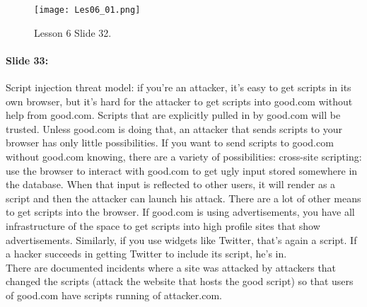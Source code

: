 \documentclass[10pt,a4paper]{report}
\begin{document}
\begin{figure}[ht!]
\centering
\texttt{[image: Les06\_01.png]}
\caption{Lesson 6 Slide 32.} 
\label{les06_01}
\end{figure}

\paragraph{Slide 33:} Script injection threat model: if you're an attacker, it's easy to get scripts in its own browser, but it's hard for the attacker to get scripts into good.com without help from good.com. Scripts that are explicitly pulled in by good.com will be trusted. Unless good.com is doing that, an attacker that sends scripts to your browser has only little possibilities. If you want to send scripts to good.com without good.com knowing, there are a variety of possibilities: cross-site scripting: use the browser to interact with good.com to get ugly input stored somewhere in the database. When that input is reflected to other users, it will render as a script and then the attacker can launch his attack. There are a lot of other means to get scripts into the browser. If good.com is using advertisements, you have all infrastructure of the space to get scripts into high profile sites that show advertisements. Similarly, if you use widgets like Twitter, that's again a script. If a hacker succeeds in getting Twitter to include its script, he's in.\\
There are documented incidents where a site was attacked by attackers that changed the scripts (attack the website that hosts the good script) so that users of good.com have scripts running of attacker.com. 
\end{document}
